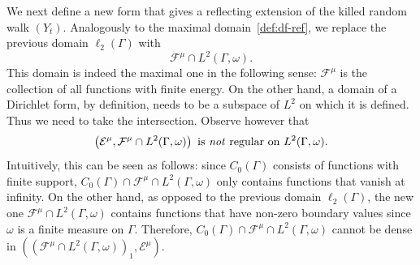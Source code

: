 \documentclass[AHL,Unicode,longabstracts,published]{cedram}
\newcommand{\ce}{\mathcal{E}}
\newcommand{\cf}{\mathcal{F}}
\begin{document}
We next define a new form that gives a reflecting extension of the killed random walk $(Y_t)$. Analogously to the maximal domain~\eqref{def:df-ref}, we replace the previous domain $\ell_2(\Gamma)$ with
\[
\cf^{\mu}\cap L^2(\Gamma,\omega).
\]
This domain is indeed the maximal one in the following sense: $\cf^{\mu}$ is the collection of all functions with finite energy. On the other hand, a domain of a Dirichlet form, by definition, needs to be a subspace of $L^2$ on which it is defined. Thus we need to take the intersection. Observe however that
\[
\left(\ce^{\mu}, \cf^{\mu}\cap L^2(\Gamma,\omega)\right)\ \text{is \emph{not} regular on}\ L^2(\Gamma,\omega).
\]
Intuitively, this can be seen as follows: since $C_0(\Gamma)$ consists of functions with finite support, $C_0(\Gamma)\cap\cf^{\mu}\cap L^2(\Gamma,\omega)$ only contains functions that vanish at infinity. On the other hand, as opposed to the previous domain $\ell_2(\Gamma)$, the new one $\cf^{\mu}\cap L^2(\Gamma,\omega)$ contains functions that have non-zero boundary values since $\omega$ is a finite measure on $\Gamma$. Therefore, $C_0(\Gamma)\cap\cf^{\mu}\cap L^2(\Gamma,\omega)$ cannot be dense in $((\cf^{\mu}\cap L^2(\Gamma,\omega))_1,\ce^{\mu})$.
\end{document}
